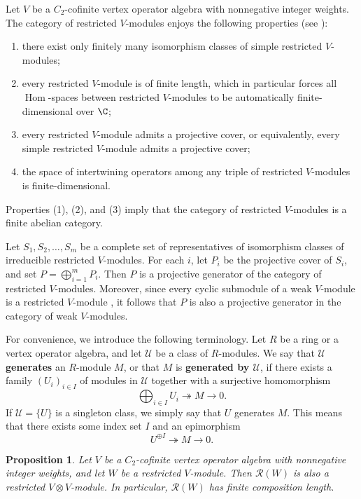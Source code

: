 \documentclass[12pt, english]{article}
\numberwithin{equation}{section}
\DeclareMathOperator{\Hom}{Hom}
\theoremstyle{plain}
\newtheorem{proposition}[lemma]{Proposition}
\theoremstyle{definition}
\theoremstyle{remark}
\begin{document}
	Let $V$ be a $C_2$-cofinite vertex operator algebra with nonnegative integer weights.
	The category of restricted $V$-modules enjoys the following properties (see \cite{ABD04, DLM00, M04, H09, YZ26}):
	\begin{enumerate}[label=(\arabic*),ref=\arabic*]
		\item there exist only finitely many isomorphism classes of simple restricted $V$-modules;
		\item every restricted $V$-module is of finite length, which in particular forces all $\Hom$-spaces between restricted $V$-modules to be automatically finite-dimensional over $\C$;
		\item every restricted $V$-module admits a projective cover, or equivalently, every simple restricted $V$-module admits a projective cover;
		\item the space of intertwining operators among any triple of restricted $V$-modules is finite-dimensional.
	\end{enumerate}
	Properties (1), (2), and (3) imply that the category of restricted $V$-modules is a finite abelian category.
	
	Let $S_1, S_2, \dots, S_m$ be a complete set of representatives of isomorphism classes of irreducible restricted $V$-modules.
	For each $i$, let $P_i$ be the projective cover of $S_i$, and set $P = \bigoplus_{i = 1}^m P_i$.
	Then $P$ is a projective generator of the category of restricted $V$-modules.
	Moreover, since every cyclic submodule of a weak $V$-module is a restricted $V$-module \cite{ABD04,M04},
	it follows that $P$ is also a projective generator in the category of weak $V$-modules.
	
	For convenience, we introduce the following terminology.
	Let $R$ be a ring or a vertex operator algebra, and let $\mathcal{U}$ be a class of $R$-modules. We say that $\mathcal{U}$ \textbf{generates} an $R$-module $M$, or that $M$ is \textbf{generated by $\mathcal{U}$},
	if there exists a family $(U_i)_{i \in I}$ of modules in $\mathcal{U}$ together with a surjective homomorphism
	\[
	\bigoplus_{i \in I} U_i \twoheadrightarrow M \to 0.
	\]
	If $\mathcal{U} = \{U\}$ is a singleton class, we simply say that $U$ generates $M$. This means that there exists some index set $I$ and an epimorphism
	\[
	U^{\oplus I} \twoheadrightarrow M \to 0.
	\]
	
	\begin{proposition} \label{prop:c2-regular-finiteness}
		Let $V$ be a $C_2$-cofinite vertex operator algebra with nonnegative integer weights, and let $W$ be a restricted $V$-module. Then $\mathcal{R}(W)$ is also a restricted $V \otimes V$-module. In particular, $\mathcal{R}(W)$ has finite composition length.
	\end{proposition}
	
\end{document}
